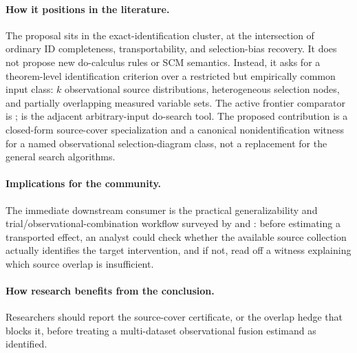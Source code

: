 \documentclass[11pt]{article}
\theoremstyle{definition}
\theoremstyle{plain}
\theoremstyle{remark}
\begin{document}
\paragraph{How it positions in the literature.}
The proposal sits in the exact-identification cluster, at the intersection of
ordinary ID completeness, transportability, and selection-bias recovery.  It
does not propose new do-calculus rules or SCM semantics.  Instead, it asks for
a theorem-level identification criterion over a restricted but empirically
common input class: \(k\) observational source distributions, heterogeneous
selection nodes, and partially overlapping measured variable sets.  The active
frontier comparator is \citet{LeeGhassamiShpitser2024DataFusionSelection};
\citet{TikkaHyttinenKarvanen2021DoSearch} is the adjacent arbitrary-input
do-search tool.  The proposed contribution is a closed-form source-cover
specialization and a canonical nonidentification witness for a named
observational selection-diagram class, not a replacement for the general
search algorithms.

\paragraph{Implications for the community.}
The immediate downstream consumer is the practical generalizability and
trial/observational-combination workflow surveyed by
\citet{DegtiarRose2023Generalizability} and \citet{ColnetEtAl2024RCTObservationalReview}:
before estimating a transported effect, an analyst could check whether the
available source collection actually identifies the target intervention, and
if not, read off a witness explaining which source overlap is insufficient.

\paragraph{How research benefits from the conclusion.}
Researchers should report the source-cover certificate, or the overlap hedge
that blocks it, before treating a multi-dataset observational fusion estimand
as identified.
\end{document}
